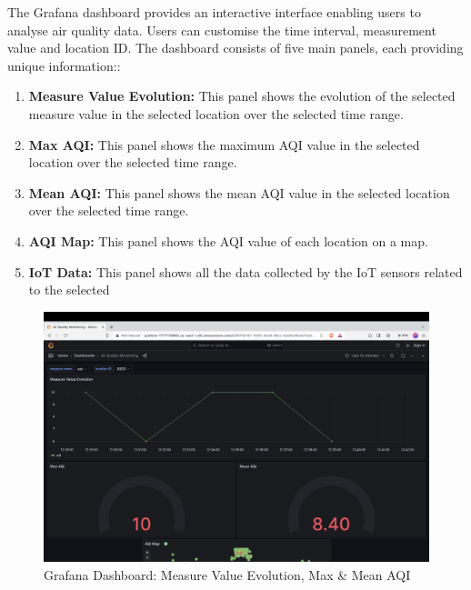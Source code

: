 \documentclass[12pt,oneside]{book} %
\begin{document}
The Grafana dashboard provides an interactive interface enabling users to
analyse air quality data. Users can customise the time interval, measurement
value and location ID. The dashboard consists of five main panels, each
providing unique information::
\begin{enumerate}
    \item \textbf{Measure Value Evolution:} This panel shows the evolution of the selected measure value in the selected location over the selected time range.
    \item \textbf{Max AQI:} This panel shows the maximum AQI value in the selected location over the selected time range.
    \item \textbf{Mean AQI:} This panel shows the mean AQI value in the selected location over the selected time range.
    \item \textbf{AQI Map:} This panel shows the AQI value of each location on a map.
    \item \textbf{IoT Data:} This panel shows all the data collected by the IoT sensors related to the selected
\end{enumerate}

\begin{figure}[H]
    \centering
    \includegraphics[width=1\linewidth]{images/grafana-1.png}
    \caption{Grafana Dashboard: Measure Value Evolution, Max \& Mean AQI}\label{fig:grafana-main-panel-1}
\end{figure}
\end{document}

